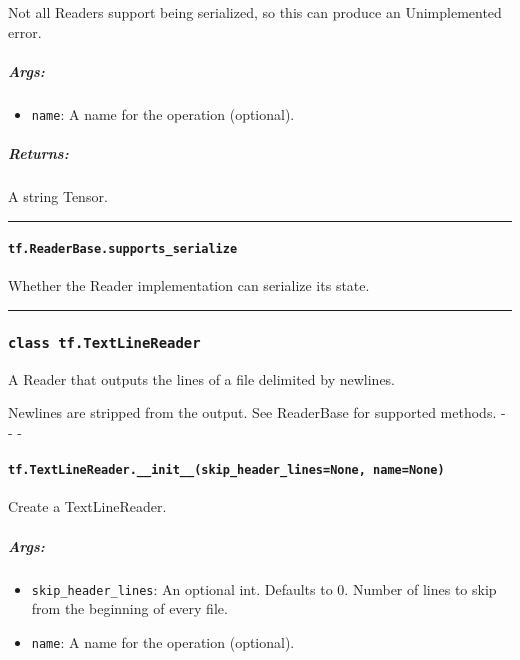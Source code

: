 Not all Readers support being serialized, so this can produce an
Unimplemented error.

\subparagraph{Args: }\label{args-7}

\begin{itemize}
\tightlist
\item
  \texttt{name}: A name for the operation (optional).
\end{itemize}

\subparagraph{Returns: }\label{returns-6}

A string Tensor.

\begin{center}\rule{0.5\linewidth}{\linethickness}\end{center}

\paragraph{\texorpdfstring{\texttt{tf.ReaderBase.supports\_serialize}
}{tf.ReaderBase.supports\_serialize }}\label{tf.readerbase.supportsux5fserialize}

Whether the Reader implementation can serialize its state.

\begin{center}\rule{0.5\linewidth}{\linethickness}\end{center}

\subsubsection{\texorpdfstring{\texttt{class\ tf.TextLineReader}
}{class tf.TextLineReader }}\label{class-tf.textlinereader}

A Reader that outputs the lines of a file delimited by newlines.

Newlines are stripped from the output. See ReaderBase for supported
methods. - - -

\paragraph{\texorpdfstring{\texttt{tf.TextLineReader.\_\_init\_\_(skip\_header\_lines=None,\ name=None)}
}{tf.TextLineReader.\_\_init\_\_(skip\_header\_lines=None, name=None) }}\label{tf.textlinereader.ux5fux5finitux5fux5fskipux5fheaderux5flinesnone-namenone}

Create a TextLineReader.

\subparagraph{Args: }\label{args-8}

\begin{itemize}
\tightlist
\item
  \texttt{skip\_header\_lines}: An optional int. Defaults to 0. Number
  of lines to skip from the beginning of every file.
\item
  \texttt{name}: A name for the operation (optional).
\end{itemize}

